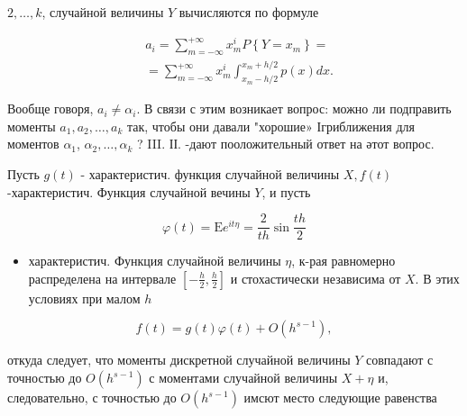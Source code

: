\documentclass[10pt]{article}
\begin{document}
$2, \ldots, k$, случайной величины $Y$ вычисляются по формуле



\[

\begin{aligned}

& a_{i}=\sum_{m=-\infty}^{+\infty} x_{m}^{i} P\left\{Y=x_{m}\right\}= \\

& =\sum_{m=-\infty}^{+\infty} x_{m}^{i} \int_{x_{m}-h / 2}^{x_{m}+h / 2} p(x) d x .

\end{aligned}

\]



Вообще говоря, $a_{i} \neq \alpha_{i}$. В связи с этим возникает вопрос: можно ли подправить моменты $a_{1}, a_{2}, \ldots, a_{k}$ так, чтобы они давали "хорошие» Ігриближения для моментов $\alpha_{1}$, $\alpha_{2}, \ldots, \alpha_{k}$ ? III. ІІ. -дают пооложительный ответ на әтот вопрос.



Пусть $g(t)$ - характеристич. функция случайной величины $X, f(t)$-характеристич. Функция случайной вечины $Y$, и пусть



\[

\varphi(t)=\mathrm{E} e^{i t \eta}=\frac{2}{t h} \sin \frac{t h}{2}

\]



\begin{itemize}

  \item характеристич. Функция случайной величины $\eta$, к-рая равномерно распределена на интервале $\left[-\frac{h}{2}, \frac{h}{2}\right]$ и стохастически независима от $X$. В этих условиях при малом $h$

\end{itemize}



\[

f(t)=g(t) \varphi(t)+O\left(h^{s-1}\right),

\]



откуда следует, что моменты дискретной случайной величины $Y$ совпадают с точностью до $O\left(h^{s-1}\right)$ с моментами случайной величины $X+\eta$ и, следовательно, с точностью до $O\left(h^{s-1}\right)$ имсют место следующие равенства
\end{document}
